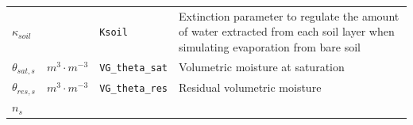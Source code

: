 \documentclass[]{book}
\begin{document}
\begin{longtable}[]{@{}llll@{}}
\begin{minipage}[t]{0.11\columnwidth}\raggedright\strut
\(\kappa_{soil}\)\strut
\end{minipage} & \begin{minipage}[t]{0.10\columnwidth}\raggedright\strut
\strut
\end{minipage} & \begin{minipage}[t]{0.06\columnwidth}\raggedright\strut
\texttt{Ksoil}\strut
\end{minipage} & \begin{minipage}[t]{0.53\columnwidth}\raggedright\strut
Extinction parameter to regulate the amount of water extracted from each
soil layer when simulating evaporation from bare soil\strut
\end{minipage}\tabularnewline
\begin{minipage}[t]{0.11\columnwidth}\raggedright\strut
\(\theta_{sat, s}\)\strut
\end{minipage} & \begin{minipage}[t]{0.10\columnwidth}\raggedright\strut
\(m^3 \cdot m^{-3}\)\strut
\end{minipage} & \begin{minipage}[t]{0.06\columnwidth}\raggedright\strut
\texttt{VG\_theta\_sat}\strut
\end{minipage} & \begin{minipage}[t]{0.53\columnwidth}\raggedright\strut
Volumetric moisture at saturation\strut
\end{minipage}\tabularnewline
\begin{minipage}[t]{0.11\columnwidth}\raggedright\strut
\(\theta_{res, s}\)\strut
\end{minipage} & \begin{minipage}[t]{0.10\columnwidth}\raggedright\strut
\(m^3 \cdot m^{-3}\)\strut
\end{minipage} & \begin{minipage}[t]{0.06\columnwidth}\raggedright\strut
\texttt{VG\_theta\_res}\strut
\end{minipage} & \begin{minipage}[t]{0.53\columnwidth}\raggedright\strut
Residual volumetric moisture\strut
\end{minipage}\tabularnewline
\begin{minipage}[t]{0.11\columnwidth}\raggedright\strut
\(n_s\)\strut
\end{minipage} & \begin{minipage}[t]{0.10\columnwidth}\raggedright\strut
\strut
\end{minipage} & \begin{minipage}[t]{0.06\columnwidth}\raggedright\strut

\end{minipage}
\end{longtable}
\end{document}
